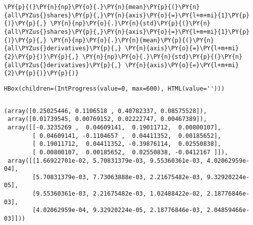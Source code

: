\begin{tcolorbox}[breakable, size=fbox, boxrule=1pt, pad at break*=1mm,colback=cellbackground, colframe=cellborder]
\begin{Verbatim}[commandchars=\\\{\}]
\PY{p}{(}\PY{n}{np}\PY{o}{.}\PY{n}{mean}\PY{p}{(}\PY{n}{all\PYZus{}shares}\PY{p}{,}\PY{n}{axis}\PY{o}{=}\PY{l+m+mi}{1}\PY{p}{)}\PY{p}{,} \PY{n}{np}\PY{o}{.}\PY{n}{std}\PY{p}{(}\PY{n}{all\PYZus{}shares}\PY{p}{,}\PY{n}{axis}\PY{o}{=}\PY{l+m+mi}{1}\PY{p}{)}\PY{p}{,} \PY{n}{np}\PY{o}{.}\PY{n}{mean}\PY{p}{(}\PY{n}{all\PYZus{}derivatives}\PY{p}{,} \PY{n}{axis}\PY{o}{=}\PY{l+m+mi}{2}\PY{p}{)}\PY{p}{,} \PY{n}{np}\PY{o}{.}\PY{n}{std}\PY{p}{(}\PY{n}{all\PYZus{}derivatives}\PY{p}{,} \PY{n}{axis}\PY{o}{=}\PY{l+m+mi}{2}\PY{p}{)}\PY{p}{)}
\end{Verbatim}
\end{tcolorbox}


    \begin{verbatim}
HBox(children=(IntProgress(value=0, max=600), HTML(value='')))
    \end{verbatim}


    \begin{Verbatim}[commandchars=\\\{\}]

    \end{Verbatim}

            \begin{tcolorbox}[breakable, size=fbox, boxrule=.5pt, pad at break*=1mm, opacityfill=0]
\begin{Verbatim}[commandchars=\\\{\}]
(array([0.25025446, 0.1106518 , 0.40782337, 0.08575528]),
 array([0.01739545, 0.00769152, 0.02222747, 0.00467389]),
 array([[-0.3235269 ,  0.04609141,  0.19011712,  0.00800107],
        [ 0.04609141, -0.1104657 ,  0.04411352,  0.00185652],
        [ 0.19011712,  0.04411352, -0.39876114,  0.02550838],
        [ 0.00800107,  0.00185652,  0.02550838, -0.0412167 ]]),
 array([[1.66922701e-02, 5.70831379e-03, 9.55360361e-03, 4.02062959e-04],
        [5.70831379e-03, 7.73063888e-03, 2.21675482e-03, 9.32920224e-05],
        [9.55360361e-03, 2.21675482e-03, 1.02488422e-02, 2.18776846e-03],
        [4.02062959e-04, 9.32920224e-05, 2.18776846e-03, 2.04859466e-03]]))
\end{Verbatim}
\end{tcolorbox}

